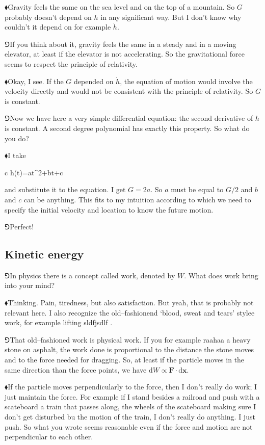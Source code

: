 \documentclass[11pt,oneside%
]{memoir}
\newenvironment{eqna}{\begin{IEEEeqnarray*}{c}}{\end{IEEEeqnarray*}\ignorespacesafterend}
\newcommand{\dd}{\mathrm{d}}
\renewcommand{\vec}[1]{\mathbf{#1}}
\newcommand{\hea}{\(\blacklozenge\)\;}
\newcommand{\heb}{\(\Game\)\;}
\begin{document}
\hea Gravity feels the same on the sea level and on the top of a mountain. So \(G\) probably doesn't depend on \(h\) in any significant way. But I don't know why couldn't it depend on for example \(\dot{h}\).

\heb If you think about it, gravity feels the same in a steady and in a moving elevator, at least if the elevator is not accelerating. So the gravitational force seems to respect the principle of relativity.

\hea Okay, I see. If the \(G\) depended on \(\dot{h}\), the equation of motion would involve the velocity directly and would not be consistent with the principle of relativity. So \(G\) is constant.


\heb Now we have here a very simple differential equation: the second derivative of \(h\) is constant. A second degree polynomial has exactly this property. So what do you do?

\hea I take
\begin{eqna}
    h(t)=at^2+bt+c
\end{eqna}
and substitute it to the equation. I get \(G=2a\). So \(a\) must be equal to \(G/2\) and \(b\) and \(c\) can be anything. This fits to my intuition according to which we need to specify the initial velocity and location to know the future motion.

\heb Perfect!
\subsection{Kinetic energy}
\heb In physics there is a concept called work, denoted by \(W\). What does work bring into your mind?

\hea Thinking. Pain, tiredness, but also satisfaction. But yeah, that is probably not relevant here. I also recognize the old--fashionend `blood, sweat and tears' stylee work, for example lifting sldfjsdlf .

\heb That old--fashioned work is physical work. If you for example raahaa a heavy stone on asphalt, the work done is proportional to the distance the stone moves and to the force needed for dragging. So, at least if the particle moves in the same direction than the force points, we have \(\dd W\propto\vec{F}\cdot\dd\vec{x}\).

\hea If the particle moves perpendicularly to the force, then I don't really do work; I just maintain the force. For example if I stand besides a railroad and push with a scateboard a train that passes along, the wheels of the scateboard making sure I don't get disturbed bu the motion of the train, I don't really do anything. I just push. So what you wrote seems reasonable even if the force and motion are not perpendicular to each other.
\end{document}
